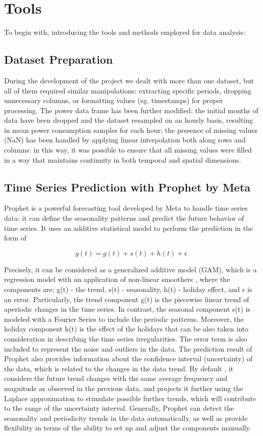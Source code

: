 \section{Tools}
\noindent

To begin with, introducing the tools and methods employed for data analysis:

\subsection{Dataset Preparation}
During the development of the project we dealt with more than one dataset, but all of them required similar manipulations: extracting specific periods, dropping unnecessary columns, or formatting values (eg. timestamps) for proper processing. 
The power data frame has been further modified: the initial months of data have been dropped and the dataset resampled on an hourly basis, resulting in mean power consumption samples for each hour; 
the presence of missing values (NaN) has been handled by applying linear interpolation both along rows and columns: in this way, it was possible to ensure that all missing values were filled in a way that maintains continuity in both temporal and spatial dimensions.

\subsection{Time Series Prediction with Prophet by Meta}
Prophet \cite{ProphetSite} is a powerful forecasting tool developed by Meta to handle time series data: it can define the seasonality patterns and predict the future behavior of time series. 
It uses an additive statistical model to perform the prediction in the form of

\[y(t) = g(t) + s(t) + h(t) + \epsilon\]

Precisely, it can be considered as a generalized additive model (GAM), which is a regression model with an application of non-linear smoothers \cite{Prophet1}, where the components are: g(t) - the trend, s(t) - seasonality, h(t) - holiday effect, and $\epsilon$ is an error. Particularly, the trend component g(t) is the piecewise linear trend of aperiodic changes in the time series. 
In contrast, the seasonal component s(t) is modeled with a Fourier Series to include the periodic patterns. 
Moreover, the holiday component h(t) is the effect of the holidays that can be also taken into consideration in describing the time series irregularities. 
The error term is also included to represent the noise and outliers in the data. 
The prediction result of Prophet also provides information about the confidence interval (uncertainty) of the data, which is related to the changes in the data trend. By default \cite{Prophet2}, it considers the future trend changes with the same average frequency and magnitude as observed in the previous data, and projects it further using the Laplace approximation to stimulate possible further trends, which will contribute to the range of the uncertainty interval. 
Generally, Prophet can detect the seasonality and periodicity trends in the data automatically, as well as provide flexibility in terms of the ability to set up and adjust the components manually.

